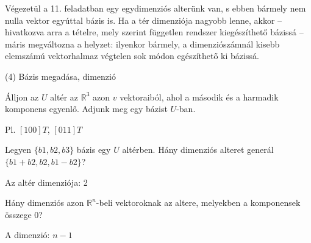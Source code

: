 \begin{frame}
\begin{tcolorbox}[title={3/11. -Q-}]
Végezetül a 11. feladatban egy egydimenziós alterünk van, s ebben bármely nem nulla vektor egyúttal bázis is. Ha a tér dimenziója nagyobb lenne, akkor – hivatkozva arra a tételre, mely szerint független rendszer kiegészíthető bázissá – máris megváltozna a helyzet: ilyenkor bármely, a dimenziószámnál kisebb elemszámú vektorhalmaz végtelen sok módon egészíthető ki bázissá.

  \end{tcolorbox}
\end{frame}



\begin{frame}[plain]
\begin{tcolorbox}[center, colback={myyellow}, coltext={black}, colframe={myyellow}]
    {\RHuge  (4) Bázis megadása, dimenzió}
    \mmedskip
\end{tcolorbox}
\end{frame}

\begin{frame}
  \begin{tcolorbox}[title={4/1. -N-}]
      Álljon az $U$ altér az $\mathbb{R}^3$ azon $v$ vektoraiból, ahol a második és a harmadik komponens egyenlő. Adjunk meg egy bázist $U$-ban.
  \tcblower

    \mmedskip 
    
    Pl. $[1 0 0]T$, $[0 1 1]T$
  \end{tcolorbox}
\end{frame}


\begin{frame}
  \begin{tcolorbox}[title={4/2. -N-}]
      Legyen $\{b1,b2,b3\}$ bázis egy $U$ altérben. Hány dimenziós alteret generál $\{b1 + b2,b2,b1 −b2\}$?
  \tcblower

    \mmedskip 
    
    Az altér dimenziója: 2
  \end{tcolorbox}
\end{frame}


\begin{frame}
  \begin{tcolorbox}[title={4/3. -R-}]
      Hány dimenziós azon $\mathbb{R}^n$-beli vektoroknak az altere, melyekben a komponensek összege $0$?
  \tcblower

    \mmedskip 
    
    A dimenzió: $n−1$
  \end{tcolorbox}
\end{frame}


